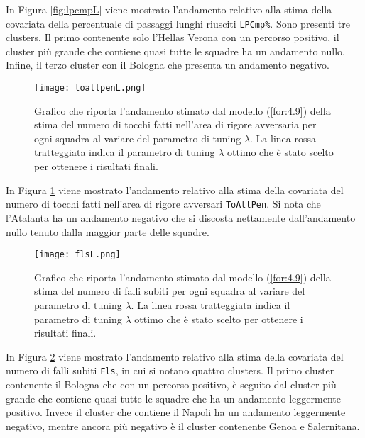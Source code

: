 In Figura \ref{fig:lpcmpL} viene mostrato l'andamento relativo alla stima della covariata della percentuale di passaggi lunghi riusciti \texttt{LPCmp\%}. Sono presenti tre clusters. Il primo contenente solo l'Hellas Verona con un percorso positivo, il cluster più grande che contiene quasi tutte le squadre ha un andamento nullo. Infine, il terzo cluster con il Bologna che presenta un andamento negativo.

\begin{figure}[htbp]
	\begin{center}
		\texttt{[image: toattpenL.png]}
		\caption{Grafico che riporta l'andamento stimato dal modello (\ref{for:4.9}) della stima del numero di tocchi fatti nell'area di rigore avversaria per ogni squadra al variare del parametro di tuning $\lambda$. La linea rossa tratteggiata indica il parametro di tuning $\lambda$ ottimo che è stato scelto per ottenere i risultati finali.} \label{fig:toattpenL}
	\end{center}
\end{figure}

In Figura \ref{fig:toattpenL} viene mostrato l'andamento relativo alla stima della covariata del numero di tocchi fatti nell'area di rigore avversari \texttt{ToAttPen}. Si nota che l'Atalanta ha un andamento negativo che si discosta nettamente dall'andamento nullo tenuto dalla maggior parte delle squadre.

\begin{figure}[htbp]
	\begin{center}
		\texttt{[image: flsL.png]}
		\caption{Grafico che riporta l'andamento stimato dal modello (\ref{for:4.9}) della stima del numero di falli subiti per ogni squadra al variare del parametro di tuning $\lambda$. La linea rossa tratteggiata indica il parametro di tuning $\lambda$ ottimo che è stato scelto per ottenere i risultati finali.} \label{fig:flsL}
	\end{center}
\end{figure}

In Figura \ref{fig:flsL} viene mostrato l'andamento relativo alla stima della covariata del numero di falli subiti \texttt{Fls}, in cui si notano quattro clusters. Il primo cluster contenente il Bologna che con un percorso positivo, è seguito dal cluster più grande che contiene quasi tutte le squadre che ha un andamento leggermente positivo. Invece il cluster che contiene il Napoli ha un andamento leggermente negativo, mentre ancora più negativo è il cluster contenente Genoa e Salernitana.

